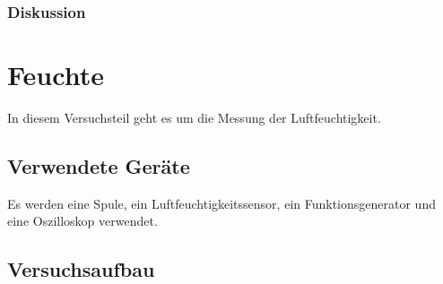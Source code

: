 \documentclass[12pt,a4paper]{article}
\begin{document}
\subsubsection*{Diskussion}



\section{Feuchte}

In diesem Versuchsteil geht es um die Messung der Luftfeuchtigkeit.

\subsection*{Verwendete Geräte}

Es werden eine Spule, ein Luftfeuchtigkeitssensor, ein Funktionsgenerator und eine Oszilloskop verwendet.


\subsection*{Versuchsaufbau}
\end{document}
